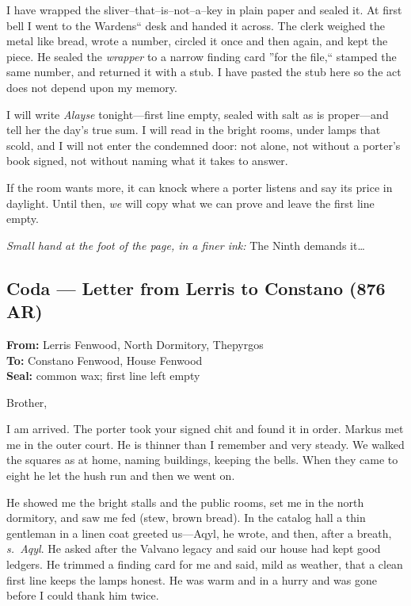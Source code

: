 \documentclass[11pt]{article}
\numberwithin{equation}{section} %
\theoremstyle{plain} %
\theoremstyle{definition} %
\theoremstyle{remark} %
\begin{document}
I have wrapped the sliver--that--is--not--a--key in plain paper and sealed it. At first bell I went to the Wardens`` desk and handed it across. The clerk weighed the metal like bread, wrote a number, circled it once and then again, and kept the piece. He sealed the \emph{wrapper} to a narrow finding card ''for the file,`` stamped the same number, and returned it with a stub. I have pasted the stub here so the act does not depend upon my memory.

I will write \textit{Alayse} tonight---first line empty, sealed with salt as is proper---and tell her the day's true sum. I will read in the bright rooms, under lamps that scold, and I will not enter the condemned door: not alone, not without a porter's book signed, not without naming what it takes to answer.

If the room wants more, it can knock where a porter listens and say its price in daylight. Until then, \textit{we} will copy what we can prove and leave the first line empty.

\medskip
\noindent\textit{Small hand at the foot of the page, in a finer ink:} The Ninth demands it\ldots{}

\subsection*{Coda --- Letter from Lerris to Constano (876 AR)}

\noindent\textbf{From:} Lerris Fenwood, North Dormitory, Thepyrgos \\
\textbf{To:} Constano Fenwood, House Fenwood \\
\textbf{Seal:} common wax; first line left empty

\medskip
\noindent Brother,

I am arrived. The porter took your signed chit and found it in order. Markus met me in the outer court. He is thinner than I remember and very steady. We walked the squares as at home, naming buildings, keeping the bells. When they came to eight he let the hush run and then we went on.

He showed me the bright stalls and the public rooms, set me in the north dormitory, and saw me fed (stew, brown bread). In the catalog hall a thin gentleman in a linen coat greeted us---Aqyl, he wrote, and then, after a breath, \emph{s.\ Aqyl}. He asked after the Valvano legacy and said our house had kept good ledgers. He trimmed a finding card for me and said, mild as weather, that a clean first line keeps the lamps honest. He was warm and in a hurry and was gone before I could thank him twice.
\end{document}
